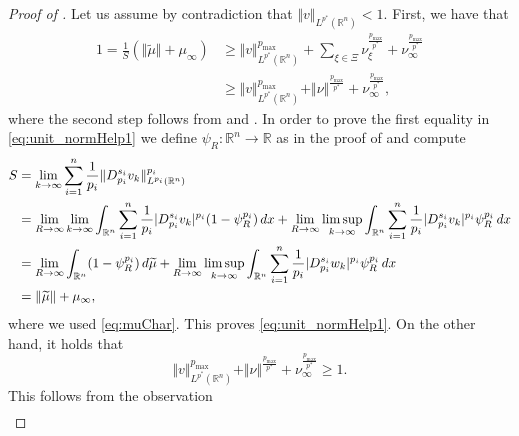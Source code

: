 \documentclass[11pt]{amsart}
\theoremstyle{plain}
\theoremstyle{definition}
\numberwithin{equation}{section}
\renewcommand{\d}{\textnormal{d}}
\newcommand{\R}{\mathbb{R}}
\begin{document}
\begin{proof} [Proof of ]
Let us assume by contradiction that $\Vert v \Vert_{L^{p^{\ast}}(\R^n)} < 1$.
First, we have that
\begin{equation}\label{eq:unit_normHelp1}
\begin{aligned}
1 = \frac{1}{S} \left(\Vert \widetilde{\mu}\Vert + \mu_{\infty}\right) & \ge \Vert v \Vert_{L^{p^{\ast}}(\R^n)}^{p_{\max}} + \sum_{\xi\in\Xi} \nu_{\xi}^{\frac{p_{\max}}{p^{\ast}}} + \nu_{\infty}^{\frac{p_{\max}}{p^{\ast}}} \\
& \ge \Vert v \Vert_{L^{p^{\ast}}(\R^n)}^{p_{\max}} + \Vert \nu \Vert^{\frac{p_{\max}}{p^{\ast}}} + \nu_{\infty}^{\frac{p_{\max}}{p^{\ast}}},
\end{aligned}
\end{equation}
where the second step follows from  and . In order to prove the first equality in \eqref{eq:unit_normHelp1} we define $\psi_R : \R^n \to \R$ as in the proof of  and compute
\begin{equation*}
\begin{split}
S &= \lim_{k \to \infty} \sum_{i=1}^n\frac{1}{p_i} \Vert D_{p_i}^{s_i}v_k \Vert_{L^{p_i}(\R^n)}^{p_i}\\
&= \lim_{R \to \infty} \lim_{k \to \infty} \int_{\R^n} \sum_{i=1}^n \frac{1}{p_i}\vert D^{s_i}_{p_i}v_k\vert^{p_i}(1-\psi_R^{p_i}) \,  \d x + \lim_{R \to \infty} \limsup_{k \to \infty} \int_{\R^n} \sum_{i=1}^n \frac{1}{p_i}\vert D^{s_i}_{p_i}v_k\vert^{p_i} \psi_R^{p_i} \, \d x\\
&= \lim_{R \to \infty} \int_{\R^n} (1-\psi_R^{p_i}) \, \d \widetilde{\mu} + \lim_{R \to \infty} \limsup_{k \to \infty} \int_{\R^n} \sum_{i=1}^n \frac{1}{p_i}\vert D^{s_i}_{p_i}w_k\vert^{p_i} \psi_R^{p_i} \, \d x\\
&= \Vert \widetilde{\mu} \Vert + \mu_{\infty},
\end{split}
\end{equation*}
where we used \eqref{eq:muChar}. This proves \eqref{eq:unit_normHelp1}.
On the other hand, it holds that
\begin{equation}
\label{eq:unit_normHelp2}
\Vert v \Vert_{L^{p^{\ast}}(\R^n)}^{p_{\max}} + \Vert \nu \Vert^{\frac{p_{\max}}{p^{\ast}}} + \nu_{\infty}^{\frac{p_{\max}}{p^{\ast}}} \ge 1.
\end{equation}
This follows from the observation
\begin{equation}
\label{eq:unit_normHelp3}
\begin{split}

\end{split}
\end{equation}
\end{proof}
\end{document}

